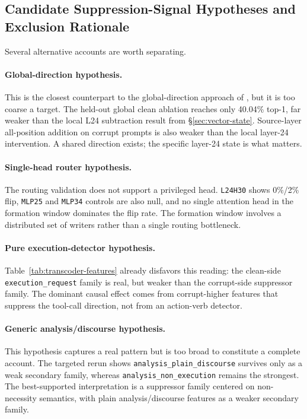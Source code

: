 \subsection{Candidate Suppression-Signal Hypotheses and Exclusion Rationale}
Several alternative accounts are worth separating.

\paragraph{Global-direction hypothesis.}
This is the closest counterpart to the global-direction approach of
\citet{arditi2024refusal}, but it is too coarse a target. The
held-out global clean ablation reaches only 40.04\% top-1, far
weaker than the local L24 subtraction result from \S\ref{sec:vector-state}.
Source-layer all-position addition on corrupt prompts is also weaker than the
local layer-24 intervention. A shared direction exists; the specific layer-24 state is what matters.

\paragraph{Single-head router hypothesis.}
The routing validation does not support a privileged head. \texttt{L24H30}
shows 0\%/2\% flip, \texttt{MLP25} and \texttt{MLP34} controls are also null,
and no single attention head in the formation window dominates the flip rate.
The formation window involves a distributed set of writers rather than a single routing bottleneck.

\paragraph{Pure execution-detector hypothesis.}
Table~\ref{tab:transcoder-features} already disfavors this reading: the
clean-side \texttt{execution\_request} family is real, but weaker than the
corrupt-side suppressor family. The dominant causal effect comes from corrupt-higher features that suppress
the tool-call direction, not from an action-verb detector.

\paragraph{Generic analysis/discourse hypothesis.}
This hypothesis captures a real pattern but is too broad to constitute a complete
account. The targeted rerun shows \texttt{analysis\_plain\_discourse} survives
only as a weak secondary family, whereas \texttt{analysis\_non\_execution} remains the strongest. The
best-supported interpretation is a suppressor family centered on
non-necessity semantics, with plain analysis/discourse features as a weaker
secondary family.

